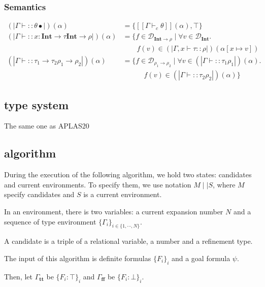 \documentclass[runningheads]{llncs}
\newcommand \true {\textbf{tt}}
\newcommand \false {\textbf{ff}}
\newcommand {\val}[1]{[\![#1]\!]}
\newcommand {\domain}[1]{\mathcal{D}_{#1}}
\newcommand \stypeint {\textbf{Int}}
\newcommand \stypebool {\bullet}
\newcommand \srtype {\rho} %
\newcommand \constraint {\theta}
\newcommand \refty {\tau}
\newcommand \typeint[1]{{#1} : \stypeint}
\newcommand \refines[2]{#1:: #2}
\newcommand \tenv {\Gamma}
\newcommand \wf[2][]{\tenv \vdash \refines{#1}{#2}}
\newcommand {\semt}[1]{(\!|#1|\!)}
\newcommand {\srt}[2]{\semt{\wf{#1}{#2}}(\alpha)}
\begin{document}
\subsubsection{Semantics}

\begin{align*}
    \srt{\constraint}{\stypebool} &= \{\val{\tenv \vdash_c \constraint}(\alpha), \top \}\\
    \srt{\typeint{x} \rightarrow \refty}{\stypeint \rightarrow \srtype} &=
      \{f \in \domain{\stypeint \rightarrow \srtype} \mid \forall v \in \domain{\stypeint}. \\
          &\quad \quad f(v) \in \semt{\tenv, x \vdash \refty:: \srtype}(\alpha[x \mapsto v])\\
    \srt{\refty_1 \rightarrow \refty_2}{\srtype_1 \rightarrow \srtype_2} &= \{f \in \domain{\srtype_1 \rightarrow \srtype_2} \mid \forall v \in
        \srt{\refty_1}{\srtype_1}. \\
          &\quad \quad \quad f(v) \in \srt{\refty_2}{\srtype_2}\}
\end{align*}

\subsection{type system}

The same one as APLAS20

\subsection{algorithm}

During the execution of the following algorithm,
we hold two states: candidates and current environments.
To specify them, we use notation \( M \mid \mid S \), where
\( M \) specify candidates and \( S \) is a current environment.

In an environment, there is two variables:
a current expansion number \( N \)
and a sequence of type environment \( \{\Gamma_i\}_{i \in \{1, \cdots, N\}} \).

A candidate is a triple of a relational variable, a number and a refinement type.

The input of this algorithm is definite formulas \(\{F_i\}_i\) and a goal formula
\(\psi\).

Then, let \( \Gamma_\true \) be \( \{F_i: \top\}_i \)
and \( \Gamma_\false \) be \( \{F_i: \bot \}_i \).
\end{document}
